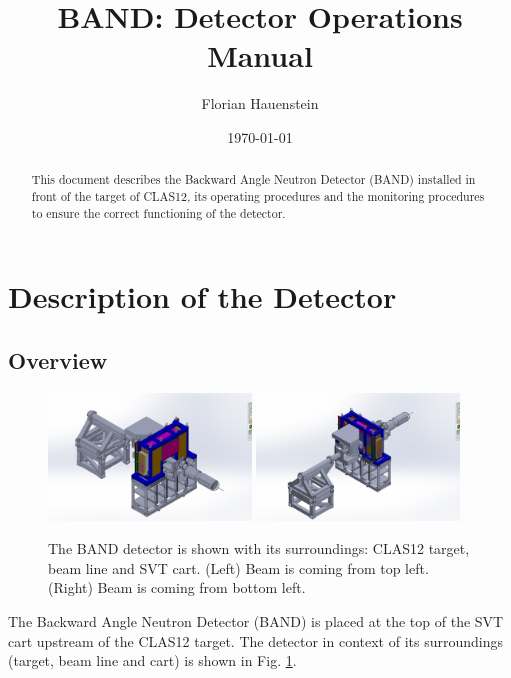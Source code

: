 \documentclass[12pt,letterpaper]{article}
\begin{document}
\title{BAND: Detector Operations Manual}



\author{
Florian Hauenstein  }
\date{\today}  

\maketitle
\begin{abstract}
This document describes the Backward Angle Neutron Detector (BAND) installed in front of the target of CLAS12, its operating procedures and the monitoring procedures to ensure the correct functioning of the detector.

\end{abstract}
\tableofcontents
\setcounter{page}{1}

\section{Description of the Detector}
\subsection{Overview}
\begin{figure}[thb]
\centering
\includegraphics[width=0.48\textwidth]{BandInContext1.png}
\includegraphics[width=0.48\textwidth]{BandInContext2.png}
 \caption{The BAND detector is shown with its surroundings: CLAS12 target, beam line and SVT cart. (Left) Beam is coming from top left. (Right) Beam is coming from bottom left. }
  \label{fig:bandcontext}
\end{figure}
The Backward Angle Neutron Detector (BAND) is placed at the top of the SVT cart upstream of the CLAS12 target. The detector in context of its surroundings (target, beam line and cart) is shown in Fig. \ref{fig:bandcontext}.
 
\end{document}
